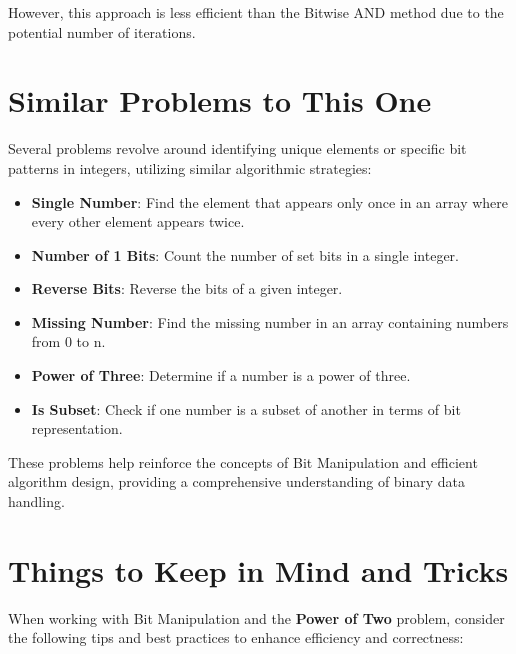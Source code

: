 However, this approach is less efficient than the Bitwise AND method due to the potential number of iterations.

\section*{Similar Problems to This One}

Several problems revolve around identifying unique elements or specific bit patterns in integers, utilizing similar algorithmic strategies:

\begin{itemize}
    \item \textbf{Single Number}: Find the element that appears only once in an array where every other element appears twice.
    \item \textbf{Number of 1 Bits}: Count the number of set bits in a single integer.
    \item \textbf{Reverse Bits}: Reverse the bits of a given integer.
    \item \textbf{Missing Number}: Find the missing number in an array containing numbers from 0 to n.
    \item \textbf{Power of Three}: Determine if a number is a power of three.
    \item \textbf{Is Subset}: Check if one number is a subset of another in terms of bit representation.
\end{itemize}

These problems help reinforce the concepts of Bit Manipulation and efficient algorithm design, providing a comprehensive understanding of binary data handling.

\section*{Things to Keep in Mind and Tricks}

When working with Bit Manipulation and the \textbf{Power of Two} problem, consider the following tips and best practices to enhance efficiency and correctness:


